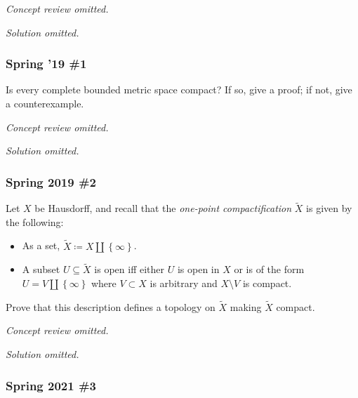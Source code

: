 \emph{Concept review omitted.}

\emph{Solution omitted.}

\hypertarget{spring-19-1}{%
\subsubsection{Spring '19 \#1}\label{spring-19-1}}

\begin{problem}[?]

Is every complete bounded metric space compact? If so, give a proof; if
not, give a counterexample.

\end{problem}


\emph{Concept review omitted.}

\emph{Solution omitted.}

\hypertarget{spring-2019-2}{%
\subsubsection{Spring 2019 \#2}\label{spring-2019-2}}

\begin{problem}[?]

Let \(X\) be Hausdorff, and recall that the \emph{one-point
compactification} \(\tilde X\) is given by the following:

\begin{itemize}
\item
  As a set,
  \(\tilde X \coloneqq X{\textstyle\coprod}\left\{{\infty}\right\}\).
\item
  A subset \(U\subseteq \tilde X\) is open iff either \(U\) is open in
  \(X\) or is of the form
  \(U = V{\textstyle\coprod}\left\{{\infty}\right\}\) where
  \(V\subset X\) is arbitrary and \(X\setminus V\) is compact.
\end{itemize}

Prove that this description defines a topology on \(\tilde X\) making
\(\tilde X\) compact.

\end{problem}

\emph{Concept review omitted.}

\emph{Solution omitted.}

\hypertarget{spring-2021-3}{%
\subsubsection{Spring 2021 \#3}\label{spring-2021-3}}

